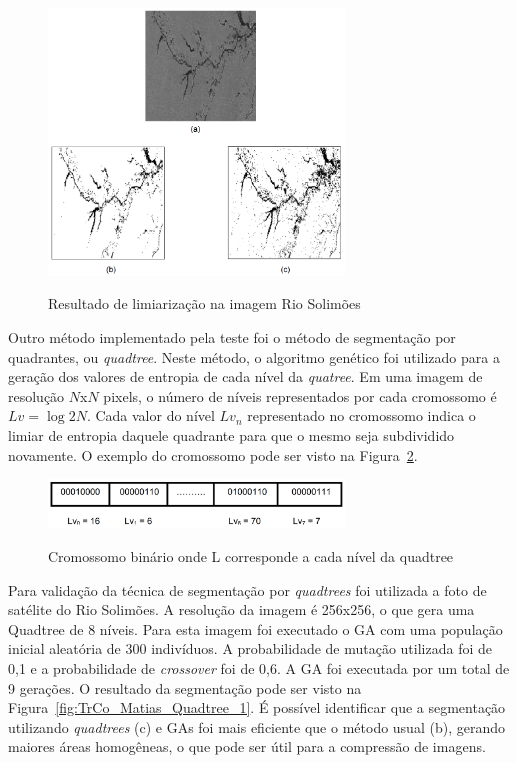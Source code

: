 \documentclass[12pt,oneside,a4paper,english,french,spanish,brazil,]{abntex2}
\begin{document}
\begin{figure}[ht]
\centering
\caption{Resultado de limiarização na imagem Rio Solimões}
\includegraphics[width=0.7\textwidth]{imagens/TrCo_Matias_Limiar_2.PNG}
\label{fig:TrCo_Matias_Limiar_2}
\end{figure}

Outro método implementado pela teste foi o método de segmentação por quadrantes, ou \textit{quadtree}. Neste método, o algoritmo genético foi utilizado para a geração dos valores de entropia de cada nível da \textit{quatree}. Em uma imagem de resolução \(N\)x\(N\) pixels, o número de níveis representados por cada cromossomo é \(Lv=\log 2 N\). Cada valor do nível \(Lv_n\) representado no cromossomo indica o limiar de entropia daquele quadrante para que o mesmo seja subdividido novamente. O exemplo do cromossomo pode ser visto na Figura~\ref{fig:TrCo_Matias_Cromossomo_1}.

\begin{figure}[ht]
\centering
\caption{Cromossomo binário onde L corresponde a cada nível da quadtree}
\includegraphics[width=0.7\textwidth]{imagens/TrCo_Matias_Cromossomo_1.PNG}
\label{fig:TrCo_Matias_Cromossomo_1}
\end{figure}

Para  validação da técnica de segmentação por \textit{quadtrees} foi utilizada a foto de satélite do Rio Solimões. A resolução da imagem é 256x256, o que gera uma Quadtree de 8 níveis. Para esta imagem foi executado o GA com uma população inicial aleatória de 300 indivíduos. A probabilidade de mutação utilizada foi de 0,1 e a probabilidade de \textit{crossover} foi de 0,6. A GA foi executada por um total de 9 gerações. O resultado da segmentação pode ser visto na Figura~\ref{fig:TrCo_Matias_Quadtree_1}. É possível identificar que a segmentação utilizando \textit{quadtrees} (c) e GAs foi mais eficiente que o método usual (b), gerando maiores áreas homogêneas, o que pode ser útil para a compressão de imagens.
\end{document}
